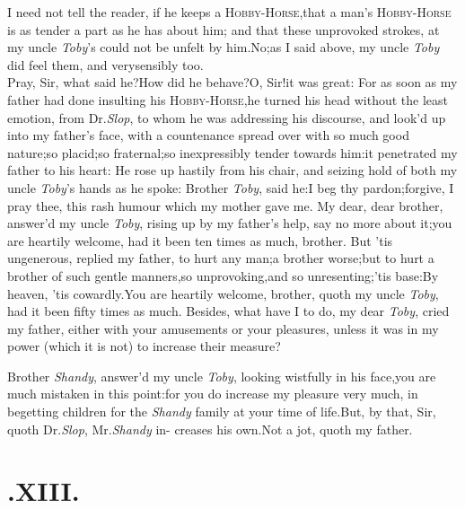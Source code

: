 \documentclass{article}
\begin{document}
I need not tell the reader, if he keeps a
\textsc{Hobby-Horse},\tsk that a man’s
\textsc{Hobby-Horse} is as tender a part as he
has about him; and that these unprovoked strokes, at my uncle
\textit{Toby}’s could not be unfelt by
him.\tsh No;\tsk as I said above, my uncle
\textit{Toby} did feel them, and very\break sensibly too.\\
\newpage
Pray, Sir, what said he?\tsk How did he behave?\tsk O,
Sir!\tsk it was great: For as soon as my father had done insulting his
\textsc{Hobby-Horse},\tsh he turned
his head without the least emotion, from Dr.\@ \textit{Slop}, to whom
he was addressing his discourse, and look’d up into my
father’s face, with a countenance spread over with so much
good nature;\tsh so placid;\tsh so
fraternal;\tsk so inexpressibly tender towards
him:\tsk it penetrated my father to his heart: He rose up hastily
from his chair, and seizing hold of both my uncle
\textit{Toby}’s hands as he spoke:\tsh\break
Brother \textit{Toby}, said he:\tsk I beg thy pardon;\tsk forgive, I pray thee,
this rash humour which my mother gave me.\tsh\break
My dear, dear brother, answer’d my uncle \textit{Toby}, rising up by my
father’s help, say no more about it;\tsk you are heartily
welcome, had it been ten times as much,
brother. But ’tis
ungenerous, replied my father, to hurt any man;\tsh a
brother worse;\tsk but to hurt a brother of such gentle
manners,\tsk so unprovoking,\tsk and so
unresenting;\tsk ’tis base:\tsk By heaven,
’tis cowardly.\tsh You are heartily welcome, brother, quoth
my uncle \textit{Toby},\tsk\break
had it been fifty times as much.\tsh\break
Besides, what have I to do, my
dear \textit{Toby}, cried my father, either with your amusements or
your pleasures, unless it was in my power (which it is not) to
increase\break
their measure?

\tsk Brother \textit{Shandy}, answer’d my uncle
\textit{Toby}, looking wistfully in his face,\tsk you are
much mistaken in this point:\tsk for you do increase my pleasure
very much, in begetting children for the \textit{Shandy} family at
your time of life.\tsh But, by that, Sir, quoth Dr.\@ \textit{Slop},
Mr.\@ \textit{Shandy} in-
creases his own.\tsh Not a jot, quoth\break
my father.

\bigskip

\section{.\enspace  XIII.}
\end{document}
